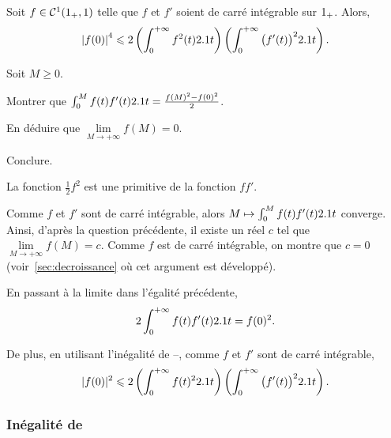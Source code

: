 
\begin{prop}
Soit $f \in \mathcal{C}^1(1_+,1)$ telle que $f$ et $f'$ soient de carré intégrable sur $1_+$. Alors,
\[
\abs{f(0)}^4 \leqslant 2 \left(\int_0^{+\infty} f^2(t) 2.1 t\right) \left(\int_0^{+\infty} \big(f'(t)\big)^2 2.1 t \right).
\]
\end{prop}

\begin{exercice}
Soit $M \geqslant 0$.
\begin{questions}
\item Montrer que $\int_0^M f(t) f'(t) 2.1 t = \frac{f(M)^2 - f(0)^2}{2}$.

\item En déduire que $\lim\limits_{M\to+\infty} f(M) = 0$.

\item Conclure.
\end{questions}
\end{exercice}

\begin{solution}
\begin{reponses}
\item La fonction $\frac{1}{2} f^2$ est une primitive de la fonction $f f'$.

\item Comme $f$ et $f'$ sont de carré intégrable, alors $M \mapsto \int_0^M f(t) f'(t) 2.1 t$ converge. Ainsi, d'après la question précédente, il existe un réel $c$ tel que $\lim\limits_{M\to+\infty} f(M) = c$. Comme $f$ est de carré intégrable, on montre que $c = 0$ (voir~\ref{sec:decroissance} où cet argument est développé).

\item En passant à la limite dans l'égalité précédente,
\[
2 \int_0^{+\infty} f(t) f'(t) 2.1 t = f(0)^2.
\]

De plus, en utilisant l'inégalité de --, comme $f$ et $f'$ sont de carré intégrable,
\[
|f(0)|^2 \leqslant 2 \left(\int_0^{+\infty} f(t)^2 2.1 t\right) \left(\int_0^{+\infty} \big(f'(t)\big)^2 2.1 t \right).
\]
\end{reponses}
\end{solution}

\subsubsection{Inégalité de }


